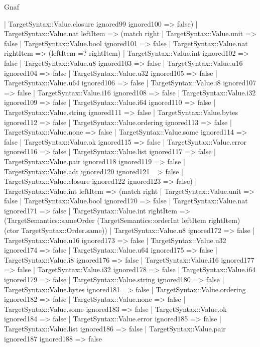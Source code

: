 \begin{lexlean}{Gnaf}
\begin{semanticmodule}
{      | TargetSyntax::Value.closure ignored99 ignored100 => false)
    | TargetSyntax::Value.nat leftItem => (match right
      | TargetSyntax::Value.unit => false
      | TargetSyntax::Value.bool ignored101 => false
      | TargetSyntax::Value.nat rightItem => (leftItem =? rightItem)
      | TargetSyntax::Value.int ignored102 => false
      | TargetSyntax::Value.u8 ignored103 => false
      | TargetSyntax::Value.u16 ignored104 => false
      | TargetSyntax::Value.u32 ignored105 => false
      | TargetSyntax::Value.u64 ignored106 => false
      | TargetSyntax::Value.i8 ignored107 => false
      | TargetSyntax::Value.i16 ignored108 => false
      | TargetSyntax::Value.i32 ignored109 => false
      | TargetSyntax::Value.i64 ignored110 => false
      | TargetSyntax::Value.string ignored111 => false
      | TargetSyntax::Value.bytes ignored112 => false
      | TargetSyntax::Value.ordering ignored113 => false
      | TargetSyntax::Value.none => false
      | TargetSyntax::Value.some ignored114 => false
      | TargetSyntax::Value.ok ignored115 => false
      | TargetSyntax::Value.error ignored116 => false
      | TargetSyntax::Value.list ignored117 => false
      | TargetSyntax::Value.pair ignored118 ignored119 => false
      | TargetSyntax::Value.adt ignored120 ignored121 => false
      | TargetSyntax::Value.closure ignored122 ignored123 => false)
    | TargetSyntax::Value.int leftItem => (match right
      | TargetSyntax::Value.unit => false
      | TargetSyntax::Value.bool ignored170 => false
      | TargetSyntax::Value.nat ignored171 => false
      | TargetSyntax::Value.int rightItem => (TargetSemantics::sameOrder (TargetSemantics::orderInt leftItem rightItem) (ctor TargetSyntax::Order.same))
      | TargetSyntax::Value.u8 ignored172 => false
      | TargetSyntax::Value.u16 ignored173 => false
      | TargetSyntax::Value.u32 ignored174 => false
      | TargetSyntax::Value.u64 ignored175 => false
      | TargetSyntax::Value.i8 ignored176 => false
      | TargetSyntax::Value.i16 ignored177 => false
      | TargetSyntax::Value.i32 ignored178 => false
      | TargetSyntax::Value.i64 ignored179 => false
      | TargetSyntax::Value.string ignored180 => false
      | TargetSyntax::Value.bytes ignored181 => false
      | TargetSyntax::Value.ordering ignored182 => false
      | TargetSyntax::Value.none => false
      | TargetSyntax::Value.some ignored183 => false
      | TargetSyntax::Value.ok ignored184 => false
      | TargetSyntax::Value.error ignored185 => false
      | TargetSyntax::Value.list ignored186 => false
      | TargetSyntax::Value.pair ignored187 ignored188 => false
}
\end{semanticmodule}
\end{lexlean}

